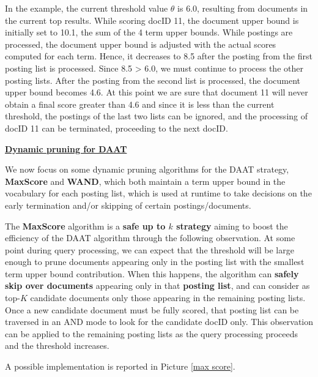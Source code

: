 In the example, the current threshold value $\theta$ is 6.0, resulting from documents in the current top results. While scoring docID 11, the document upper bound is initially set to 10.1, the sum of the 4 term upper bounds. While postings are processed, the document upper bound is adjusted with the actual scores computed for each term. Hence, it decreases to 8.5 after the posting from the first posting list is processed. Since 8.5 > 6.0, we must continue to process the other posting lists. After the posting from the second list is processed, the document upper bound becomes 4.6. At this point we are sure that document 11 will never obtain a final score greater than 4.6 and since it is less than the current threshold, the postings of the last two lists can be ignored, and the processing of docID 11 can be terminated, proceeding to the
next docID.

\underline{\textbf{Dynamic pruning for DAAT}}

We now focus on some dynamic pruning algorithms for the DAAT strategy, \textbf{MaxScore} and \textbf{WAND}, which both maintain a term upper bound in the vocabulary for each posting list, which is used at runtime to take decisions on the early termination and/or skipping of certain postings/documents.

The \textbf{MaxScore} algorithm is a \textbf{safe up to $k$ strategy} aiming to boost the efficiency of the DAAT algorithm through the following observation. At some point during query processing, we can expect that the threshold will be large enough to prune documents appearing only in the posting list with the smallest term upper bound contribution. When this happens, the algorithm can \textbf{safely skip over documents} appearing only in that \textbf{posting list}, and can consider as top-$K$ candidate documents only those appearing in the remaining posting lists. Once a new candidate document must be fully scored, that posting list can be traversed in an AND mode to look for the candidate docID only. This observation can be applied to the remaining posting lists as the query processing proceeds and the threshold increases. 

A possible implementation is reported in Picture \ref{max score}.  


